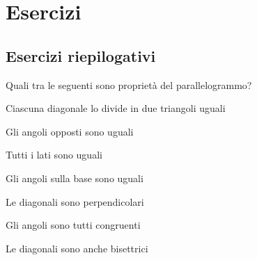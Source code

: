
\section{Esercizi}

\subsection{Esercizi riepilogativi}

\begin{esercizio}
\label{ese:4.1}
Quali tra le seguenti sono proprietà del parallelogrammo?
\begin{enumeratea}
\item Ciascuna diagonale lo divide in due triangoli uguali\hfill\boxV\quad\boxF
\item Gli angoli opposti sono uguali\hfill\boxV\quad\boxF
\item Tutti i lati sono uguali\hfill\boxV\quad\boxF
\item Gli angoli sulla base sono uguali\hfill\boxV\quad\boxF
\item Le diagonali sono perpendicolari\hfill\boxV\quad\boxF
\item Gli angoli sono tutti congruenti\hfill\boxV\quad\boxF
\item Le diagonali sono anche bisettrici\hfill\boxV\quad\boxF
\end{enumeratea}
\end{esercizio}

